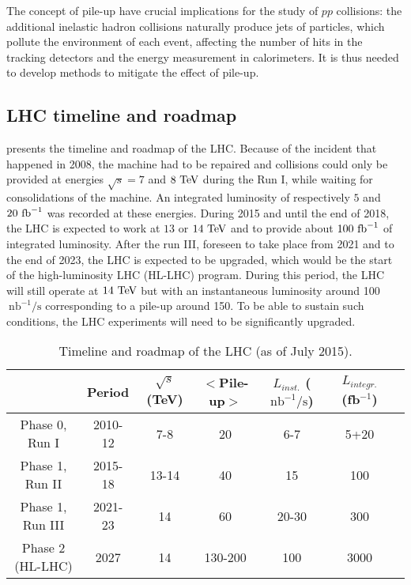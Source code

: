 
    The concept of pile-up have crucial implications for the study of $pp$ collisions: the
    additional inelastic hadron collisions naturally produce jets of particles, which
    pollute the environment of each event, affecting the number of hits in the tracking
    detectors and the energy measurement in calorimeters. It is thus needed to develop
    methods to mitigate the effect of pile-up.

    \subsection{LHC timeline and roadmap}

     presents the timeline and roadmap of the LHC. Because of the
    incident that happened in 2008, the machine had to be repaired and collisions could
    only be provided at energies $\sqrt{s} = 7$ and $8~\text{TeV}$ during the Run I, while waiting for consolidations
    of the machine. An integrated luminosity of respectively $5$ and $20~\text{fb}^{-1}$ was recorded
    at these energies. During 2015 and until the end of 2018, the LHC is expected to work
    at $13$ or $14~\text{TeV}$ and to provide about $100~\text{fb}^{-1}$ of integrated luminosity. After
    the run III, foreseen to take place from 2021 and to the end of 2023, the LHC is expected to be upgraded,
    which would be the start of the high-luminosity LHC (HL-LHC) program. During this period,
    the LHC will still operate at $14~\text{TeV}$ but with an instantaneous luminosity around
    100$~\text{nb}^{-1} / \text{s}$ corresponding to a pile-up around 150. To be able to
    sustain such conditions, the LHC experiments will need to be significantly upgraded.

    \begin{table}[h]
        \begin{tabular}{|c|c|c|c|c|c|c|}
            \hline
            & Period
            & $\sqrt{s}$ (TeV)
            & $<$Pile-up$>$
            & $L_{inst.}$ ($\text{nb}^{-1} / \text{s}$)
            & $L_{integr.}$ (fb$^{-1}$) \\
            \hline
            Phase 0, Run I    & 2010-12 & 7-8   & 20      & 6-7   & 5+20\\
            \hline
            \hline
            Phase 1, Run II   & 2015-18 & 13-14 & 40      & 15    & 100\\
            Phase 1, Run III  & 2021-23 & 14    & 60      & 20-30 & 300\\
            \hline
            \hline
            Phase 2 (HL-LHC)  & 2027    & 14    & 130-200 & 100   & 3000\\
            \hline
        \end{tabular}
        \caption{Timeline and roadmap of the LHC (as of July 2015).\label{tab:LHCtimeline}}
    \end{table}

